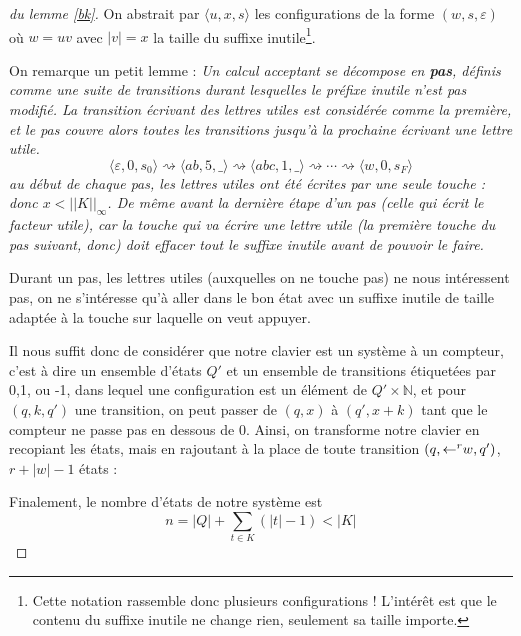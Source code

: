 \documentclass[12pt, a4paper]{article}
\newcommand{\Kinf}{||K||_{\infty}}
\begin{document}
    \begin{proof}[du lemme \ref{bk}]
        On abstrait par $\langle u,x,s \rangle$ les configurations de la forme $(w,s,\varepsilon)$ où $w = uv$ avec $|v| = x$ la taille du suffixe inutile\footnote{Cette notation rassemble donc plusieurs configurations ! L'intérêt est que le contenu du suffixe inutile ne change rien, seulement sa taille importe.}.
        
        On remarque un petit lemme : 
    \textit{
        Un calcul acceptant se décompose en \textbf{pas}, définis comme une suite de transitions durant lesquelles le préfixe inutile n'est pas modifié. La transition écrivant des lettres utiles est considérée comme la première, et le pas couvre alors toutes les transitions jusqu'à la prochaine écrivant une lettre utile. 
        \[ \langle\varepsilon,0,s_0\rangle \rightsquigarrow \langle ab,5,\_\rangle \rightsquigarrow \langle abc,1,\_\rangle \rightsquigarrow \cdots \rightsquigarrow \langle w,0,s_F\rangle \]
        au début de chaque pas, les lettres utiles ont été écrites par une seule touche : donc $x < \Kinf$. De même avant la dernière étape d'un pas (celle qui écrit le facteur utile), car la touche qui va écrire une lettre utile (la première touche du pas suivant, donc) doit effacer tout le suffixe inutile avant de pouvoir le faire.
    }

        Durant un pas, les lettres utiles (auxquelles on ne touche pas) ne nous intéressent pas, on ne s'intéresse qu'à aller dans le bon état avec un suffixe inutile de taille adaptée à la touche sur laquelle on veut appuyer.
        
        Il nous suffit donc de considérer que notre clavier est un système à un compteur, c'est à dire un ensemble d'états $Q'$ et un ensemble de transitions étiquetées par 0,1, ou -1, dans lequel une configuration est un élément de $Q' \times \mathbb{N}$, et pour $(q,k,q')$ une transition, on peut passer de $(q,x)$ à $(q',x+k)$ tant que le compteur ne passe pas en dessous de 0.
        Ainsi, on transforme notre clavier en recopiant les états, mais en rajoutant à la place de toute transition $(q,\mathord{\leftarrow}^rw,q')$, $r+|w|-1$ états : 
        
        Finalement, le nombre d'états de notre système est 
        \[n = |Q| + \sum_{t \in K} (|t| - 1) < |K|\] 


\end{proof}
\end{document}
